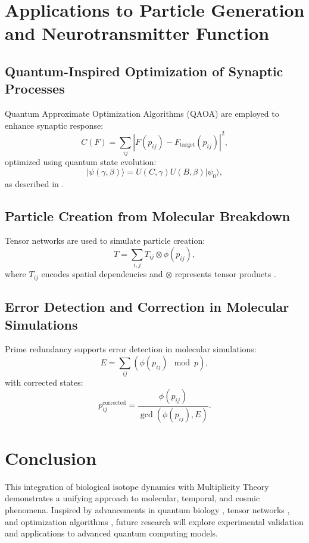 \documentclass{article}
\theoremstyle{plain}
\begin{document}
\section{Applications to Particle Generation and Neurotransmitter Function}
\subsection{Quantum-Inspired Optimization of Synaptic Processes}
Quantum Approximate Optimization Algorithms (QAOA) are employed to enhance synaptic response:
\begin{equation}
C(F) = \sum_{ij} |F(p_{ij}) - F_{\text{target}}(p_{ij})|^2,
\end{equation}
optimized using quantum state evolution:
\begin{equation}
|\psi(\gamma, \beta)\rangle = U(C, \gamma) U(B, \beta) |\psi_0\rangle,
\end{equation}
as described in \cite{QuantumOptimization2023}.

\subsection{Particle Creation from Molecular Breakdown}
Tensor networks are used to simulate particle creation:
\begin{equation}
T = \sum_{i,j} T_{ij} \otimes \phi(p_{ij}),
\end{equation}
where \( T_{ij} \) encodes spatial dependencies and \( \otimes \) represents tensor products \cite{TensorNetworks2022}.

\subsection{Error Detection and Correction in Molecular Simulations}
Prime redundancy supports error detection in molecular simulations:
\begin{equation}
E = \sum_{ij} (\phi(p_{ij}) \mod p),
\end{equation}
with corrected states:
\begin{equation}
p_{ij}^{\text{corrected}} = \frac{\phi(p_{ij})}{\gcd(\phi(p_{ij}), E)}.
\end{equation}

\section{Conclusion}
This integration of biological isotope dynamics with Multiplicity Theory demonstrates a unifying approach to molecular, temporal, and cosmic phenomena. Inspired by advancements in quantum biology \cite{QuantumBiology2017}, tensor networks \cite{TensorNetworks2022}, and optimization algorithms \cite{QuantumOptimization2023}, future research will explore experimental validation and applications to advanced quantum computing models.



\end{document}
